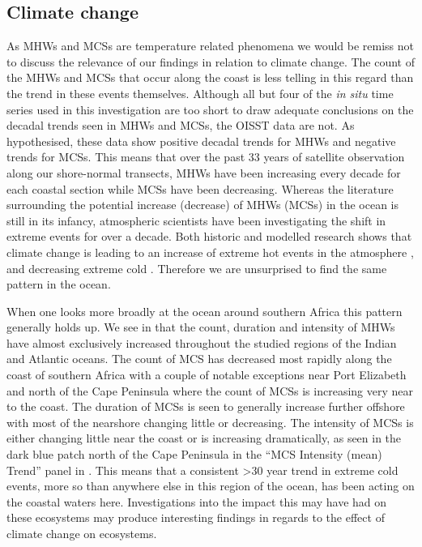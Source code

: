 \documentclass[a4paper,10pt,review]{elsarticle}
\begin{document}
\subsection{Climate change}
As MHWs and MCSs are temperature related phenomena we would be remiss not to discuss the relevance of our findings in relation to climate change. The count of the MHWs and MCSs that occur along the coast is less telling in this regard than the trend in these events themselves. Although all but four of the \emph{in situ} time series used in this investigation are too short to draw adequate conclusions on the decadal trends seen in MHWs and MCSs, the OISST data are not. As hypothesised, these data show positive decadal trends for MHWs and negative trends for MCSs. This means that over the past 33 years of satellite observation along our shore-normal transects, MHWs have been increasing every decade for each coastal section while MCSs have been decreasing. Whereas the literature surrounding the potential increase (decrease) of MHWs (MCSs) in the ocean is still in its infancy, atmospheric scientists have been investigating the shift in extreme events for over a decade. Both historic and modelled research shows that climate change is leading to an increase of extreme hot events in the atmosphere \citep{Easterling2000, Perkins2013}, and decreasing extreme cold \citep{Meehl2004}. Therefore we are unsurprised to find the same pattern in the ocean.

When one looks more broadly at the ocean around southern Africa this pattern generally holds up. We see in  that the count, duration and intensity of MHWs have almost exclusively increased throughout the studied regions of the Indian and Atlantic oceans. The count of MCS has decreased most rapidly along the coast of southern Africa with a couple of notable exceptions near Port Elizabeth and north of the Cape Peninsula where the count of MCSs is increasing very near to the coast. The duration of MCSs is seen to generally increase further offshore with most of the nearshore changing little or decreasing. The intensity of MCSs is either changing little near the coast or is increasing dramatically, as seen in the dark blue patch north of the Cape Peninsula in the ``MCS Intensity (mean) Trend'' panel in . This means that a consistent >30 year trend in extreme cold events, more so than anywhere else in this region of the ocean, has been acting on the coastal waters here. Investigations into the impact this may have had on these ecosystems may produce interesting findings in regards to the effect of climate change on ecosystems.
\end{document}
